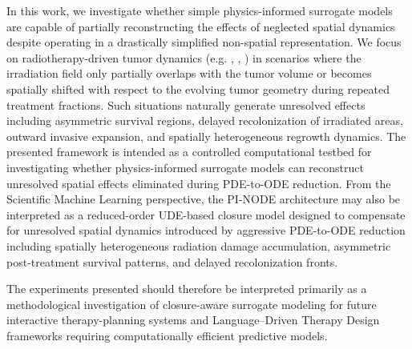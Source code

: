 In this work, we investigate whether simple physics-informed surrogate
models are capable of partially reconstructing the effects of neglected
spatial dynamics despite operating in a drastically simplified
non-spatial representation. We focus on radiotherapy-driven tumor
dynamics (e.g. \cite{Balcerak2025GliODIL}, \cite{sun2025physicsinformed}, \cite{Sujitha2023RadiotherapyBrainTumor}) in scenarios where the irradiation field only partially
overlaps with the tumor volume or becomes spatially shifted with respect
to the evolving tumor geometry during repeated treatment fractions. Such
situations naturally generate unresolved effects including asymmetric
survival regions, delayed recolonization of irradiated areas, outward
invasive expansion, and spatially heterogeneous regrowth dynamics.
The presented framework is intended as a controlled computational
testbed for investigating whether physics-informed surrogate models can
reconstruct unresolved spatial effects eliminated during PDE-to-ODE
reduction. From the Scientific Machine Learning perspective, the
PI-NODE architecture may also be interpreted as a reduced-order
UDE-based \cite{rackauckas2019diffeqflux} closure model designed to compensate for unresolved spatial
dynamics introduced by aggressive PDE-to-ODE reduction including spatially heterogeneous radiation damage accumulation,
asymmetric post-treatment survival patterns, and delayed
recolonization fronts.

The experiments presented should therefore be interpreted primarily as a
methodological investigation of closure-aware surrogate modeling for
future interactive therapy-planning systems and Language–Driven Therapy
Design frameworks requiring computationally efficient predictive models.

